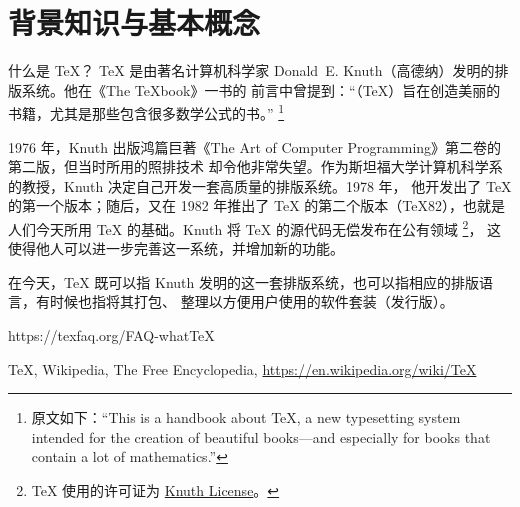 \section{背景知识与基本概念}

\begin{faq}{什么是 \TeX{}？}
\TeX{} 是由著名计算机科学家 Donald~E. Knuth（高德纳）发明的排版系统。他在《The \TeX book》一书的
前言中曾提到：“（\TeX{}）旨在创造美丽的书籍，尤其是那些包含很多数学公式的书。”
\footnote{原文如下：“This is a handbook about \TeX{}, a new typesetting system intended for the
creation of beautiful books---and especially for books that contain a lot of mathematics.”}

1976 年，Knuth 出版鸿篇巨著《The Art of Computer Programming》第二卷的第二版，但当时所用的照排技术
却令他非常失望。作为斯坦福大学计算机科学系的教授，Knuth 决定自己开发一套高质量的排版系统。1978 年，
他开发出了 \TeX{} 的第一个版本；随后，又在 1982 年推出了 \TeX{} 的第二个版本（\TeX 82），也就是
人们今天所用 \TeX{} 的基础。Knuth 将 \TeX{} 的源代码无偿发布在公有领域
\footnote{\TeX{} 使用的许可证为 \href{https://www.ctan.org/license/knuth}{Knuth License}。}，
这使得他人可以进一步完善这一系统，并增加新的功能。

在今天，\TeX{} 既可以指 Knuth 发明的这一套排版系统，也可以指相应的排版语言，有时候也指将其打包、
整理以方便用户使用的软件套装（发行版）。

\begin{reference}
  \item https://texfaq.org/FAQ-whatTeX
  \item \TeX{}, Wikipedia, The Free Encyclopedia, \url{https://en.wikipedia.org/wiki/TeX}
\end{reference}

%
%

\end{faq}

